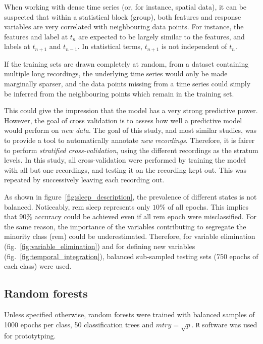 When working with dense time series (or, for instance, spatial data), it can be suspected that within a statistical block (group),
both features and response variables are very correlated with neighbouring data points.
For instance, the features and label at $t_n$ are expected to be largely similar to the features, and labels at $t_{n+1}$ and $t_{n-1}$.
In statistical terms, $t_{n+1}$ is not independent of $t_{n}$.

If the training sets are drawn completely at random, from a dataset containing multiple long recordings,
the underlying time series would only be made marginally sparser, and the data points missing from
a time series could simply be inferred from the neighbouring points which remain in the training set.

This could give the impression that the model has a very strong predictive power.
However, the goal of cross validation is to assess how well a predictive model would perform on \emph{new data}.
The goal of this study, and most similar studies, was to provide a tool to automatically annotate \emph{new recordings}.
Therefore, it is fairer to perform \emph{stratified cross-validation}, using the different recordings as the stratum levels.
In this study, all cross-validation were performed by training the model with all but one recordings,
and testing it on the recording kept out. This was repeated by successively leaving each recording out.

As shown in figure~\ref{fig:sleep_description}, the prevalence of different states is not balanced. Noticeably, \gls{rem} sleep represents only $10\%$ of all epochs.
This implies that $90\%$ accuracy could be achieved even if all \gls{rem} epoch were misclassified.
For the same reason, the importance of the variables contributing to segregate the minority class (\gls{rem}) could be underestimated.
Therefore, for variable elimination (fig.~\ref{fig:variable_elimination}) and for defining new variables (fig.~\ref{fig:temporal_integration}),
balanced sub-sampled testing sets (750 epochs of each class) were used.

\subsection{Random forests}
Unless specified otherwise, random forests \citationneeded{} were trained with balanced samples of 1000 epochs per class,
50 classification trees and $mtry =\sqrt{p}$.
\texttt{R} software \citationneeded{} was used for prototytping.

